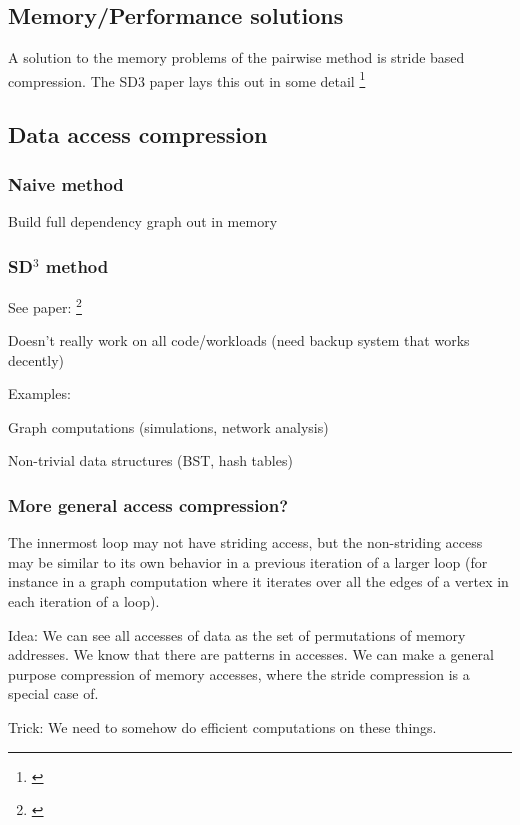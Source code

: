 \documentclass[12pt,twoside]{reedthesis}
\begin{document}
		\subsection{Memory/Performance solutions}
		
		A solution to the memory problems of the pairwise method is stride based compression. The SD3 paper lays this out in some detail \footnote{\cite{Kim:2010}}
		
		\subsection{Data access compression}
		
		\subsubsection{Naive method}
		
		Build full dependency graph out in memory
		
		\subsubsection{SD$^3$ method}
		
		See paper: \footnote{\cite{Kim:2010}}
		
		Doesn’t really work on all code/workloads (need backup system that works decently)
		
		Examples:
		
		Graph computations (simulations, network analysis)
		
		Non-trivial data structures (BST, hash tables)
		
		\subsubsection{More general access compression?}
		
		The innermost loop may not have striding access, but the non-striding access may be similar to its own behavior in a previous iteration of a larger loop (for instance in a graph computation where it iterates over all the edges of a vertex in each iteration of a loop). 
		
		
		Idea: We can see all accesses of data as the set of permutations of memory addresses. We know that there are patterns in accesses. We can make a general purpose compression of memory accesses, where the stride compression is a special case of. 
		
		Trick: We need to somehow do efficient computations on these things.
		
\end{document}

